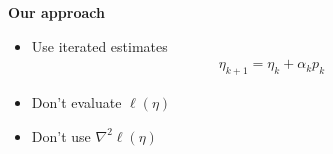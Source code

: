 \documentclass[ 10pt]{beamer}
\newcommand{\etaMLE}{\hat{\eta}_{\textrm{MLE}}}
\begin{document}
{\begin{columns}[]
\begin{column}[t]{0.4\textwidth}
{\small
\begin{block}{
\textbf{Our approach}}
\begin{itemize}
\item Use iterated estimates
\begin{align*}
	\eta_{k+1} = \eta_k + \alpha_k p_k
\end{align*}
\item Don't evaluate $\ell( \eta)$
\vspace{1mm}

\item Don't use $\nabla^2 \ell( \eta)$
\end{itemize}
\end{block}
}
\end{column}
\end{columns}

}

%
%
%
%
\end{document}
